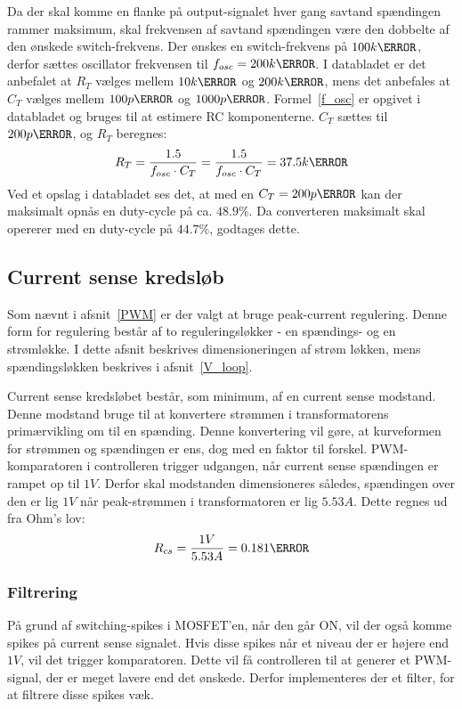 Da der skal komme en flanke på output-signalet hver gang savtand spændingen rammer maksimum, skal frekvensen af savtand spændingen være den dobbelte af den ønskede switch-frekvens. Der ønskes en switch-frekvens på $100k\hertz$, derfor sættes oscillator frekvensen til $f_{osc}=200k\hertz$. I databladet er det anbefalet at $R_T$ vælges mellem $10k\ohm$ og $200k\ohm$, mens det anbefales at $C_T$ vælges mellem $100p\farad$ og $1000p\farad$. Formel~\ref{f_osc} er opgivet i databladet og bruges til at estimere RC komponenterne. $C_T$ sættes til $200p\farad$, og $R_T$ beregnes:
\begin{equation} \label{f_osc}
R_{T} = \frac{1.5}{f_{osc} \cdot C_T} = \frac{1.5}{f_{osc} \cdot C_T} = 37.5k\ohm
\end{equation}
Ved et opslag i databladet ses det, at med en $C_T=200p\farad$ kan der maksimalt opnås en duty-cycle på ca. $48.9\percent$. Da converteren maksimalt skal opererer med en duty-cycle på $44.7\percent$, godtages dette.

\subsection{Current sense kredsløb} \label{CS_loop}
Som nævnt i afsnit~\ref{PWM} er der valgt at bruge peak-current regulering. Denne form for regulering består af to reguleringsløkker - en spændings- og en strømløkke. I dette afsnit beskrives dimensioneringen af strøm løkken, mens spændingsløkken beskrives i afsnit~\ref{V_loop}.

Current sense kredsløbet består, som minimum, af en current sense modstand. Denne modstand bruge til at konvertere strømmen i transformatorens primærvikling om til en spænding. Denne konvertering vil gøre, at kurveformen for strømmen og spændingen er ens, dog med en faktor til forskel. PWM-komparatoren i controlleren trigger udgangen, når current sense spændingen er rampet op til $1V$. Derfor skal modstanden dimensioneres således, spændingen over den er lig $1V$ når peak-strømmen i transformatoren er lig $5.53A$. Dette regnes ud fra Ohm's lov:
\begin{equation} \label{R_cs}
R_{cs} = \frac{1V}{5.53A} = 0.181\ohm
\end{equation}



\subsubsection{Filtrering}
På grund af switching-spikes i MOSFET'en, når den går ON, vil der også komme spikes på current sense signalet. Hvis disse spikes når et niveau der er højere end $1V$, vil det trigger komparatoren. Dette vil få controlleren til at generer et PWM-signal, der er meget lavere end det ønskede. Derfor implementeres der et filter, for at filtrere disse spikes væk.

